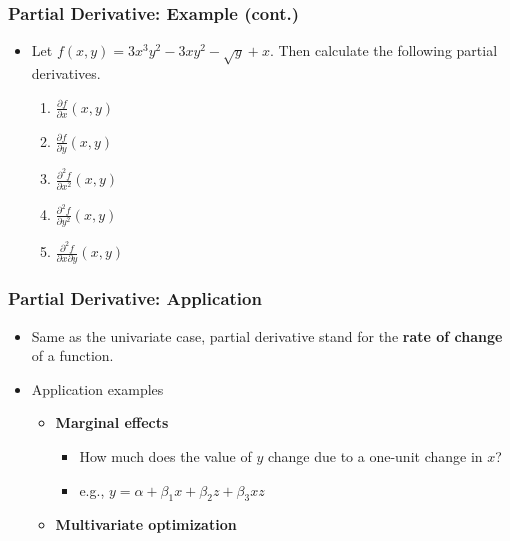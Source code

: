 \documentclass[pdflatex, 12pt]{beamer}
\begin{document}
\begin{frame}
\frametitle{Partial Derivative: Example (cont.)}
\begin{itemize}
\item Let $f(x, y) = 3x^3y^2 - 3xy^2 - \sqrt{y} + x$. Then calculate the following partial derivatives.
 \begin{enumerate}
 \item $\frac{\partial f}{\partial x} (x, y)$
 \vspace{0.1cm}
 \item $\frac{\partial f}{\partial y} (x, y)$
 \vspace{0.1cm}
 \item $\frac{\partial^2 f}{\partial x^2} (x, y)$
 \vspace{0.1cm}
 \item $\frac{\partial^2 f}{\partial y^2} (x, y)$
 \vspace{0.1cm}
 \item $\frac{\partial^2 f}{\partial x \partial y} (x, y)$
 \end{enumerate}
\end{itemize}
\end{frame}

\begin{frame}
\frametitle{Partial Derivative: Application}
\begin{itemize}
\item Same as the univariate case, partial derivative stand for the \textbf{rate of change} of a function.
\vspace{0.4cm}
\item Application examples
 \begin{itemize}
 \item \textbf{Marginal effects}
  \begin{itemize}
  \item How much does the value of $y$ change due to a one-unit change in $x$?
  \item e.g., $y = \alpha + \beta_1 x + \beta_2 z + \beta_3 xz$  
  \end{itemize}
 \item \textbf{Multivariate optimization}
 \end{itemize} 
\end{itemize}
\end{frame}
\end{document}
